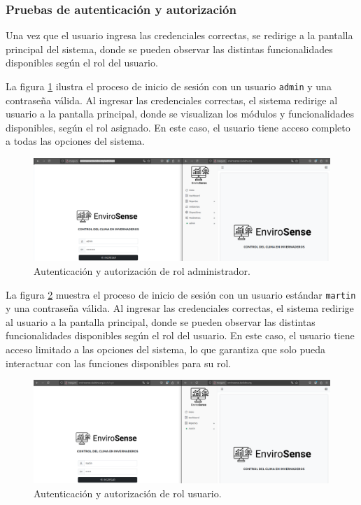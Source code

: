 \subsubsection{Pruebas de autenticación y autorización}
Una vez que el usuario ingresa las credenciales correctas, se redirige a la
pantalla principal del sistema, donde se pueden observar las distintas
funcionalidades disponibles según el rol del usuario.

La figura \ref{fig:login_correcto_admin} ilustra el proceso de inicio de sesión
con un usuario \texttt{admin} y una contraseña válida. Al ingresar las
credenciales correctas, el sistema redirige al usuario a la pantalla principal,
donde se visualizan los módulos y funcionalidades disponibles, según el rol
asignado. En este caso, el usuario tiene acceso completo a todas las opciones
del sistema.

\begin{figure}[H]
    \centering
    \includegraphics[width=\textwidth]{Images/42_login_correcto_admin.png}
    \caption[Autenticación y autorización rol administrador]{Autenticación y autorización de rol administrador.}
    \label{fig:login_correcto_admin}
\end{figure}

La figura \ref{fig:login_correcto_user} muestra el proceso de inicio de sesión
con un usuario estándar \texttt{martin} y una contraseña válida. Al ingresar
las credenciales correctas, el sistema redirige al usuario a la pantalla
principal, donde se pueden observar las distintas funcionalidades disponibles
según el rol del usuario. En este caso, el usuario tiene acceso limitado a las
opciones del sistema, lo que garantiza que solo pueda interactuar con las
funciones disponibles para su rol.

\begin{figure}[H]
    \centering
    \includegraphics[width=\textwidth]{Images/43_login_correcto_user.png}
    \caption[Autenticación y autorización rol usuario]{Autenticación y autorización de rol usuario.}
    \label{fig:login_correcto_user}
\end{figure}

